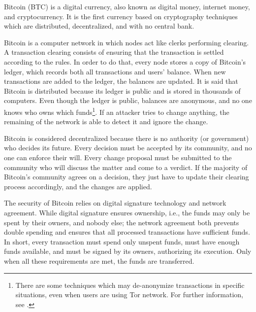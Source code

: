 Bitcoin (BTC) is a digital currency, also known as digital money, internet money, and cryptocurrency. It is the first currency based on cryptography techniques which are distributed, decentralized, and with no central bank.

Bitcoin is a computer network in which nodes act like clerks performing clearing. A transaction clearing consists of ensuring that the transaction is settled according to the rules. In order to do that, every node stores a copy of Bitcoin's ledger, which records both all transactions and users' balance. When new transactions are added to the ledger, the balances are updated. It is said that Bitcoin is distributed because its ledger is public and is stored in thousands of computers. Even though the ledger is public, balances are anonymous, and no one knows who owns which funds\footnote{There are some techniques which may de-anonymize transactions in specific situations, even when users are using Tor network. For further information, see \citet{shentu2015research, biryukov2014deanonymisation, jawaheri2018small}.}. If an attacker tries to change anything, the remaining of the network is able to detect it and ignore the change.

Bitcoin is considered decentralized because there is no authority (or government) who decides its future. Every decision must be accepted by its community, and no one can enforce their will. Every change proposal must be submitted to the community who will discuss the matter and come to a verdict. If the majority of Bitcoin's community agrees on a decision, they just have to update their clearing process accordingly, and the changes are applied.

The security of Bitcoin relies on digital signature technology and network agreement. While digital signature ensures ownership, i.e., the funds may only be spent by their owners, and nobody else; the network agreement both prevents double spending and ensures that all processed transactions have sufficient funds. In short, every transaction must spend only unspent funds, must have enough funds available, and must be signed by its owners, authorizing its execution. Only when all these requirements are met, the funds are transferred.

